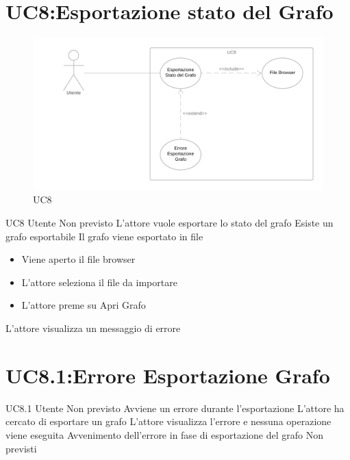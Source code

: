 \documentclass[../AnalisideiRequisiti.tex]{subfiles}
\begin{document}
\section{UC8:Esportazione stato del Grafo}
\begin{figure}[H]
	\caption{UC8}
	\centering
	\includegraphics[width=\textwidth]{../img/UC08.png}
\end{figure}
\UserCase
{UC8}
{Utente}
{Non previsto}
{L'attore vuole esportare lo stato del grafo}
{Esiste un grafo esportabile}
{Il grafo viene esportato in file}
{
	\begin{itemize}
			\item{} Viene aperto il file browser
			\item{} L'attore seleziona il file da importare
			\item{} L'attore preme su Apri Grafo
	\end{itemize}
}
{L'attore visualizza un messaggio di errore }

\section{UC8.1:Errore Esportazione Grafo}
\UserCase
{UC8.1}
{Utente}
{Non previsto}
{Avviene un errore durante l'esportazione}
{L'attore ha cercato di esportare un grafo}
{L'attore visualizza l'errore e nessuna operazione viene eseguita}
{Avvenimento dell'errore in fase di esportazione del grafo}
{Non previsti}
\end{document}
